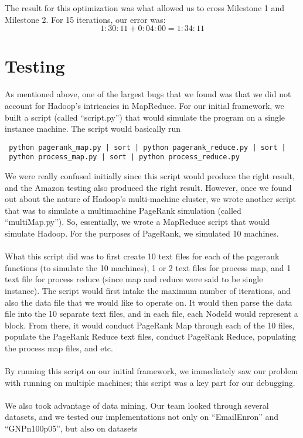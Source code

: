 \documentclass{article}
\begin{document}
The result for this optimization was what allowed us to cross Milestone 1 and Milestone 2. For 15 iterations, our error was: $$1:30:11 + 0:04:00 = 1:34:11$$

\section{Testing}
 As mentioned above, one of the largest bugs that we found was that we did not account for Hadoop's intricacies in MapReduce. For our initial framework, we built a script (called ``script.py'') that would simulate the program on a single instance machine. The script would basically run
 \begin{verbatim}
 python pagerank_map.py | sort | python pagerank_reduce.py | sort | 
 python process_map.py | sort | python process_reduce.py
 \end{verbatim}
 We were really confused initially since this script would produce the right result, and the Amazon testing also produced the right result. However, once we found out about the nature of Hadoop's multi-machine cluster, we wrote another script that was to simulate a multimachine PageRank simulation (called ``multiMap.py''). So, essentially, we wrote a MapReduce script that would simulate Hadoop. For the purposes of PageRank, we simulated 10 machines.
 \\ \\
 What this script did was to first create 10 text files for each of the pagerank functions (to simulate the 10 machines), 1 or 2 text files for process map, and 1 text file for process reduce (since map and reduce were said to be single instance). The script would first intake the maximum number of iterations, and also the data file that we would like to operate on. It would then parse the data file into the 10 separate text files, and in each file, each NodeId would represent a block. From there, it would conduct PageRank Map through each of the 10 files, populate the PageRank Reduce text files, conduct PageRank Reduce, populating the process map files, and etc.
 \\ \\
 By running this script on our initial framework, we immediately saw our problem with running on multiple machines; this script was a key part for our debugging.
 \\ \\
 We also took advantage of data mining. Our team looked through several datasets, and we tested our implementations not only on ``EmailEnron'' and ``GNPn100p05'', but also on datasets 
\end{document}
